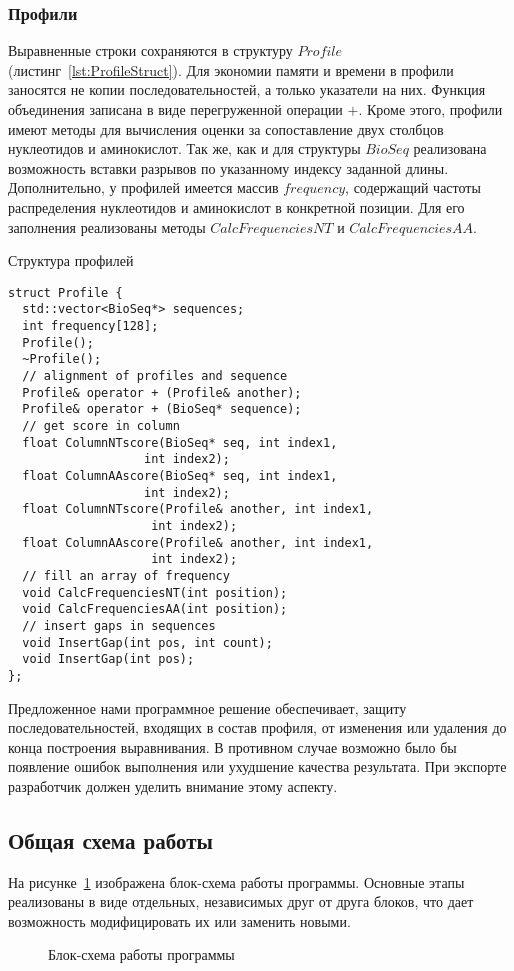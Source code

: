 \subsubsection[Профили]{\large Профили}
\hspace{\parindent} Выравненные строки сохраняются в структуру $Profile$ (листинг~\ref{lst:ProfileStruct}). Для экономии памяти и времени в профили заносятся не копии последовательностей, а только указатели на них. Функция объединения записана в виде перегруженной операции $+$. Кроме этого, профили имеют методы для вычисления оценки за сопоставление двух столбцов нуклеотидов и аминокислот. Так же, как и для структуры $BioSeq$ реализована возможность вставки разрывов по указанному индексу заданной длины. Дополнительно, у профилей имеется массив $frequency$, содержащий частоты распределения нуклеотидов и аминокислот в конкретной позиции. Для его заполнения реализованы методы $CalcFrequenciesNT$ и $CalcFrequenciesAA$.\\
\begin{algorithm}
	\caption{Структура профилей} \label{lst:ProfileStruct}
	\begin{lstlisting}
struct Profile {
  std::vector<BioSeq*> sequences;
  int frequency[128];
  Profile();
  ~Profile();
  // alignment of profiles and sequence
  Profile& operator + (Profile& another);
  Profile& operator + (BioSeq* sequence);
  // get score in column
  float ColumnNTscore(BioSeq* seq, int index1, 
  				   int index2);
  float ColumnAAscore(BioSeq* seq, int index1, 
  				   int index2);
  float ColumnNTscore(Profile& another, int index1, 
  					int index2);
  float ColumnAAscore(Profile& another, int index1, 
  					int index2);
  // fill an array of frequency
  void CalcFrequenciesNT(int position);
  void CalcFrequenciesAA(int position);
  // insert gaps in sequences
  void InsertGap(int pos, int count);
  void InsertGap(int pos);  
};
	\end{lstlisting}
	
\end{algorithm}

\indent Предложенное нами программное решение обеспечивает, защиту последовательностей, входящих в состав профиля, от изменения или удаления до конца построения выравнивания. В противном случае возможно было бы появление ошибок выполнения или ухудшение качества результата. При экспорте разработчик должен уделить внимание этому аспекту.

\subsection[Общая схема работы]{\large Общая схема работы}
\hspace{\parindent} На рисунке~\ref{ris:scheme} изображена блок-схема работы программы. Основные этапы реализованы в виде отдельных, независимых друг от друга блоков, что дает возможность модифицировать их или заменить новыми. 
\begin{figure}[H]
	\caption{Блок-схема работы программы}
	\label{ris:scheme}
\end{figure}

